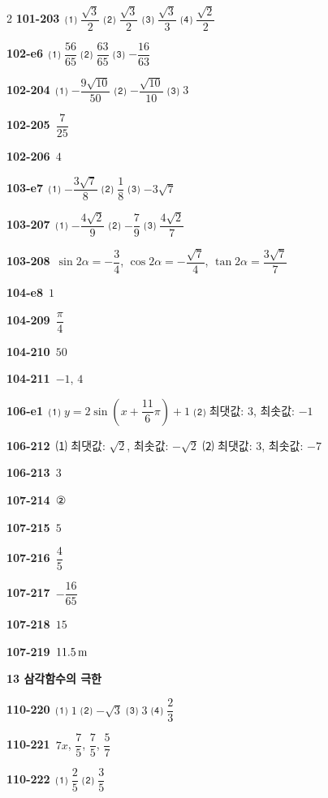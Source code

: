 \documentclass[10pt,a4paper]{article}
\begin{document}
\begin{multicols}{2}
\noindent\textbf{101-203}\ ⑴ $\dfrac{\sqrt{3}}{2}$ ⑵ $\dfrac{\sqrt{3}}{2}$ ⑶ $\dfrac{\sqrt{3}}{3}$ ⑷ $\dfrac{\sqrt{2}}{2}$\par
\noindent\textbf{102-e6}\ ⑴ $\dfrac{56}{65}$ ⑵ $\dfrac{63}{65}$ ⑶ $-\dfrac{16}{63}$\par
\noindent\textbf{102-204}\ ⑴ $-\dfrac{9\sqrt{10}}{50}$ ⑵ $-\dfrac{\sqrt{10}}{10}$ ⑶ $3$\par
\noindent\textbf{102-205}\ $\dfrac{7}{25}$\par
\noindent\textbf{102-206}\ $4$\par
\noindent\textbf{103-e7}\ ⑴ $-\dfrac{3\sqrt{7}}{8}$ ⑵ $\dfrac{1}{8}$ ⑶ $-3\sqrt{7}$\par
\noindent\textbf{103-207}\ ⑴ $-\dfrac{4\sqrt{2}}{9}$ ⑵ $-\dfrac{7}{9}$ ⑶ $\dfrac{4\sqrt{2}}{7}$\par
\noindent\textbf{103-208}\ $\sin 2\alpha=-\dfrac{3}{4}$, $\cos 2\alpha=-\dfrac{\sqrt{7}}{4}$, $\tan 2\alpha=\dfrac{3\sqrt{7}}{7}$\par
\noindent\textbf{104-e8}\ $1$\par
\noindent\textbf{104-209}\ $\dfrac{\pi}{4}$\par
\noindent\textbf{104-210}\ $50$\par
\noindent\textbf{104-211}\ $-1$, $4$\par
\noindent\textbf{106-e1}\ ⑴ $y=2\sin\left(x+\dfrac{11}{6}\pi\right)+1$ ⑵ 최댓값: $3$, 최솟값: $-1$\par
\noindent\textbf{106-212}\ ⑴ 최댓값: $\sqrt{2}$, 최솟값: $-\sqrt{2}$ ⑵ 최댓값: $3$, 최솟값: $-7$\par
\noindent\textbf{106-213}\ $3$\par
\noindent\textbf{107-214}\ ②\par
\noindent\textbf{107-215}\ $5$\par
\noindent\textbf{107-216}\ $\dfrac{4}{5}$\par
\noindent\textbf{107-217}\ $-\dfrac{16}{65}$\par
\noindent\textbf{107-218}\ $15$\par
\noindent\textbf{107-219}\ $11.5\mkern3mu \mathrm{m}$\par
\noindent\textbf{13 삼각함수의 극한}\par\smallskip
\noindent\textbf{110-220}\ ⑴ $1$ ⑵ $-\sqrt{3}$ ⑶ $3$ ⑷ $\dfrac{2}{3}$\par
\noindent\textbf{110-221}\ $7x$, $\dfrac{7}{5}$, $\dfrac{7}{5}$, $\dfrac{5}{7}$\par
\noindent\textbf{110-222}\ ⑴ $\dfrac{2}{5}$ ⑵ $\dfrac{3}{5}$\par

\end{multicols}
\end{document}
